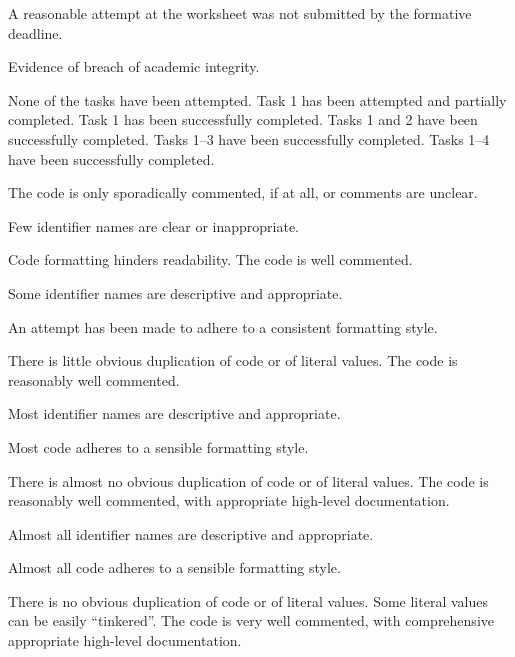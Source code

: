 \documentclass{../../../fal_assignment}
\begin{document}
\begin{markingrubric}
		\grade\fail	A reasonable attempt at the worksheet was not submitted by the formative deadline.
		\par Evidence of breach of academic integrity.
		
        \grade\fail None of the tasks have been attempted.
		\grade Task 1 has been attempted and partially completed.
		\grade Task 1 has been successfully completed.
		\grade Tasks 1 and 2 have been successfully completed.
		\grade Tasks 1--3 have been successfully completed.
		\grade Tasks 1--4 have been successfully completed.

        \grade \fail The code is only sporadically commented, if at all, or comments are unclear.
            \par Few identifier names are clear or inappropriate.
            \par Code formatting hinders readability.
        \grade The code is well commented.
            \par Some identifier names are descriptive and appropriate.
            \par An attempt has been made to adhere to a consistent formatting style.
             \par There is little obvious duplication of code or of literal values.           
        \grade The code is reasonably well commented.
            \par Most identifier names are descriptive and appropriate.
            \par Most code adheres to a sensible formatting style.
             \par There is almost no obvious duplication of code or of literal values.   
        \grade The code is reasonably well commented, with appropriate high-level documentation.
            \par Almost all identifier names are descriptive and appropriate.
            \par Almost all code adheres to a sensible formatting style.
             \par There is no obvious duplication of code or of literal values. Some literal values can be easily ``tinkered''. 
        \grade The code is very well commented, with comprehensive appropriate high-level documentation.

\end{markingrubric}
\end{document}
